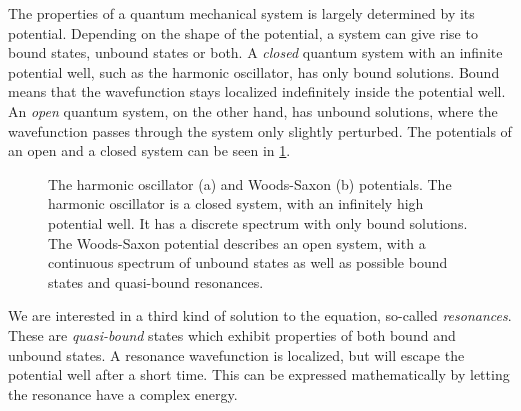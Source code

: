 \documentclass[../main/report.tex]{subfiles}
\begin{document}
The properties of a quantum mechanical system is largely determined by its potential. 
Depending on the shape of the potential, a system can give rise to bound states, unbound states or both.
A \emph{closed} quantum system with an infinite potential well, such as the harmonic oscillator, has only bound solutions. 
Bound means that the wavefunction stays localized indefinitely inside the potential well. 
An \emph{open} quantum system, on the other hand, has unbound solutions, where the wavefunction passes through the system only slightly perturbed. 
The potentials of an open and a closed system can be seen in \cref{fig:potentials}.

\begin{figure}
  \newcommand{\axes}[6]{
    \draw[->] (#2, 0) -- (#3, 0) node[right] {#1};
    \draw[->] (0, #5) -- (0, #6) node[above] {#4};
  }
  \caption{The harmonic oscillator (a) and Woods-Saxon (b) potentials. The harmonic oscillator is a closed system, with an infinitely high potential well. It has a discrete spectrum with only bound solutions. The Woods-Saxon potential describes an open system, with a continuous spectrum of unbound states as well as possible bound states and quasi-bound resonances.}
  \label{fig:potentials}
\end{figure}

We are interested in a third kind of solution to the equation, so-called \emph{resonances}. 
These are \emph{quasi-bound} states which exhibit properties of both bound and unbound states. 
A resonance wavefunction is localized, but will escape the potential well after a short time.
This can be expressed mathematically by letting the resonance have a complex energy.
\end{document}
